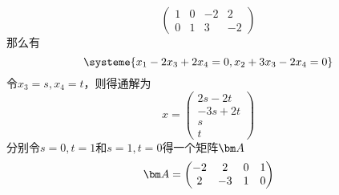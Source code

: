 \begin{solution}
\[\begin{pmatrix}
            1 & 0 & -2 & 2  \\
            0 & 1 & 3  & -2
        \end{pmatrix}
    \]
    那么有
    \[
        \systeme{
            x_1 -2x_3 + 2x_4 = 0,
            x_2 + 3x_3 - 2x_4 = 0
        }
    \]
    令$x_3 = s, x_4=t$，则得通解为
    \[
        x =
        \begin{pmatrix}
            2s - 2t \\
            -3s+2t  \\
            s       \\
            t
        \end{pmatrix}
    \]
    分别令$s=0,t=1$和$s=1,t=0$得一个矩阵$\mat{A}$
    \[
        \mat{A} =
        \begin{pmatrix}
            -2 & 2  & 0 & 1 \\
            2  & -3 & 1 & 0
        \end{pmatrix}
    \]
\end{solution}
